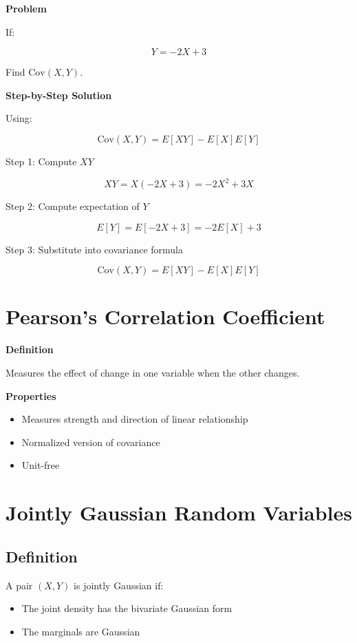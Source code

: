\documentclass[12pt]{article}
\begin{document}
\textbf{Problem}

If:

\[
Y = -2X + 3
\]

Find $\text{Cov}(X, Y)$.

\textbf{Step-by-Step Solution}

Using:

\[
\text{Cov}(X, Y) = E[XY] - E[X]E[Y]
\]

Step 1: Compute $XY$

\[
XY = X(-2X + 3) = -2X^2 + 3X
\]

Step 2: Compute expectation of $Y$

\[
E[Y] = E[-2X + 3] = -2E[X] + 3
\]

Step 3: Substitute into covariance formula

\[
\text{Cov}(X, Y) = E[XY] - E[X]E[Y]
\]

\section{Pearson’s Correlation Coefficient}

\textbf{Definition}

Measures the effect of change in one variable when the other changes.

\textbf{Properties}

\begin{itemize}
\item Measures strength and direction of linear relationship
\item Normalized version of covariance
\item Unit-free
\end{itemize}

\section{Jointly Gaussian Random Variables}

\subsection{Definition}

A pair $(X, Y)$ is jointly Gaussian if:

\begin{itemize}
\item The joint density has the bivariate Gaussian form
\item The marginals are Gaussian
\end{itemize}
\end{document}
